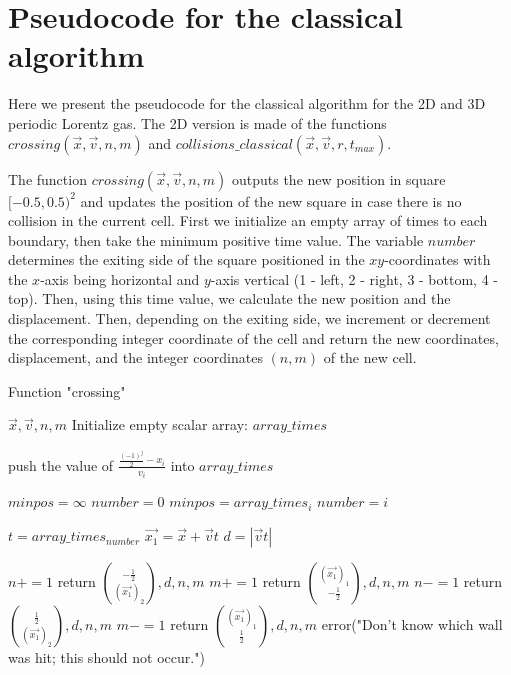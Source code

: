 \documentclass{iopart}
\begin{document}
\DeclarePairedDelimiter\ceil{\lceil}{\rceil}
\DeclarePairedDelimiter\floor{\lfloor}{\rfloor}

\appendix

\section{Pseudocode for the classical algorithm}

Here we present the pseudocode for the classical algorithm for the 2D and 3D periodic Lorentz gas. The 2D version is made of the functions $crossing(\vec{x}, \vec{v}, n, m)$ and $collisions\_classical(\vec{x}, \vec{v}, r, t_{max})$.

The function $crossing(\vec{x}, \vec{v}, n, m)$ outputs the new position in square $[-0.5, 0.5)^2$ and updates the position of the new square in case there is no collision in the current cell. First we initialize an empty array of times to each boundary, then take the minimum positive time value. The variable $number$ determines the exiting side of the square positioned in the $xy$-coordinates with the $x$-axis being horizontal and $y$-axis vertical (1 - left, 2 - right, 3 - bottom, 4 - top). Then, using this time value, we calculate the new position and the displacement. Then, depending on the exiting side, we increment or decrement the corresponding integer coordinate of the cell and return the new coordinates, displacement, and the integer coordinates $(n, m)$ of the new cell.

\begin{algorithm}
\caption{Function "crossing"}
\label{alg:crossing}
\begin{algorithmic}
 {$\vec{x}, \vec{v}, n, m$}
\State    Initialize empty scalar array: $array\_times$

			\State push the value of $\frac{\frac{(-1)^j}{2} - x_i}{v_i}$ into $array\_times$
		\EndFor
	\EndFor
	
\State	$minpos = \infty$
\State	$number = 0$
			\State $minpos = array\_times_i$
			\State $number = i$
		\EndIf			
	\EndFor
	
\State	$t = array\_times_{number}$
\State	$\vec{x_1} = \vec{x} + \vec{v} t$
\State	$d = |\vec{v}t|$
	
		\State $n += 1$
		\State return $\binom{-\frac{1}{2}}{(\vec{x_1})_2}, d, n, m$
		\State $m += 1$
		\State return $\binom{(\vec{x_1})_1}{-\frac{1}{2}}, d, n, m$
		\State $n -= 1$
		\State return $\binom{\frac{1}{2}}{(\vec{x_1})_2}, d, n, m$
		\State $m -= 1$
		\State return $\binom{(\vec{x_1})_1}{\frac{1}{2}}, d, n, m$
	\Else 
	    \State error("Don't know which wall was hit; this should not occur.")
	\EndIf
\EndFunction
\end{algorithmic}
\end{algorithm}
\end{document}
